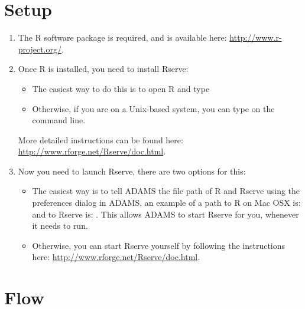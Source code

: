 \documentclass[a4paper]{book}
\begin{document}
\chapter{Setup}
\sloppy
\begin{enumerate}
	\item The R software package is required, and is available
		here: \url{http://www.r-project.org/}.
	\item Once R is installed, you need to install Rserve:
		\begin{itemize}
		  \item The easiest way to do this is to open R and type
		  \item Otherwise, if you are on a Unix-based system, you can type 
		   on the
		  command line.
		\end{itemize}
		More detailed instructions can be found here:
		\url{http://www.rforge.net/Rserve/doc.html}.
	\item Now you need to launch Rserve, there are two options for this:
		\begin{itemize}
		  \item The easiest way is to tell ADAMS the file path of R and Rserve using
		  the preferences dialog in ADAMS, an example of a path to R on Mac OSX is:
		   and to Rserve is:
		  .
		  This allows ADAMS to start Rserve for you, whenever it needs to run.
		  \item Otherwise, you can start Rserve yourself by following the instructions
		  here: \url{http://www.rforge.net/Rserve/doc.html}.
		\end{itemize}
\end{enumerate}
\fussy

\chapter{Flow}
\end{document}
